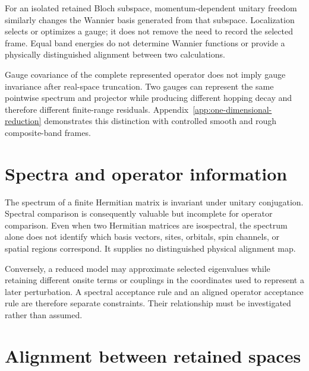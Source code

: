 For an isolated retained Bloch subspace, momentum-dependent unitary freedom
similarly changes the Wannier basis generated from that subspace. Localization
selects or optimizes a gauge; it does not remove the need to record the selected
frame. Equal band energies do not determine Wannier functions or provide a
physically distinguished alignment between two calculations.

Gauge covariance of the complete represented operator does not imply gauge
invariance after real-space truncation. Two gauges can represent the same
pointwise spectrum and projector while producing different hopping decay and
therefore different finite-range residuals. Appendix~\ref{app:one-dimensional-reduction}
demonstrates this distinction with controlled smooth and rough composite-band
frames.


\section{Spectra and operator information}


The spectrum of a finite Hermitian matrix is invariant under unitary
conjugation. Spectral comparison is consequently valuable but incomplete for
operator comparison. Even when two Hermitian matrices are isospectral, the
spectrum alone does not identify which basis vectors, sites, orbitals, spin
channels, or spatial regions correspond. It supplies no distinguished physical
alignment map.

Conversely, a reduced model may approximate selected eigenvalues while
retaining different onsite terms or couplings in the coordinates used to
represent a later perturbation. A spectral acceptance rule and an aligned
operator acceptance rule are therefore separate constraints. Their relationship
must be investigated rather than assumed.

\section{Alignment between retained spaces}


